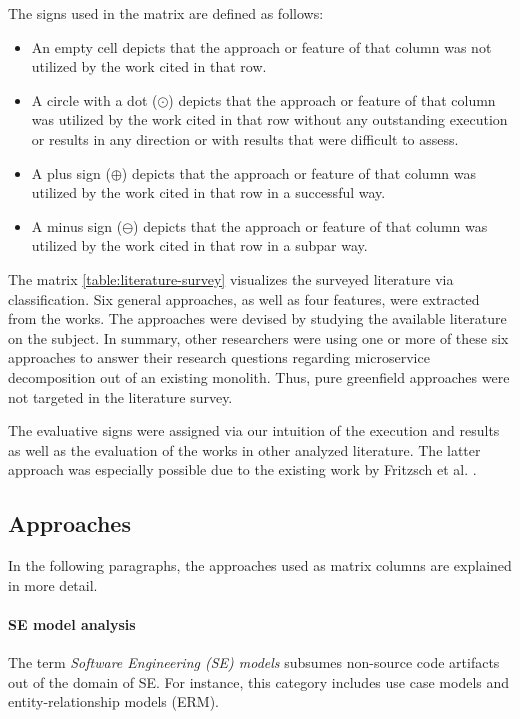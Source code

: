 \documentclass[12pt,a4paper]{report}
\begin{document}
\begin{table}[ht!]
{  The signs used in the matrix  are defined as follows:
  \begin{itemize}[noitemsep]
      \item An empty cell depicts that the approach or feature of that column was not utilized
      by the work cited in that row.
      \item A circle with a dot ($\odot$) depicts that the approach or feature
      of that column was utilized by the work cited in that row without any outstanding execution
      or results in any direction or with results that were difficult to assess.
      \item A plus sign ($\oplus$) depicts that the approach or feature
      of that column was utilized by the work cited in that row in a successful way.
      \item A minus sign ($\ominus$) depicts that the approach or feature
      of that column was utilized by the work cited in that row in a subpar way.
  \end{itemize}
}
\label{table:literature-survey}
\end{table}

The matrix \ref{table:literature-survey} visualizes the surveyed literature via
classification. Six general approaches, as well as four features, were
extracted from the works. The approaches were devised by studying the available
literature on the subject. In summary, other researchers were using one or more
of these six approaches to answer their research questions regarding
microservice decomposition out of an existing monolith. Thus, pure greenfield
approaches were not targeted in the literature survey.

The evaluative signs were assigned via our intuition of the execution and
results as well as the evaluation of the works in other analyzed literature.
The latter approach was especially possible due to the existing work by
Fritzsch et al. \cite{fritzsch2018monolith}.


\subsection*{Approaches}

In the following paragraphs, the approaches used as matrix columns are
explained in more detail.

\paragraph{SE model analysis}
The term \textit{Software Engineering (SE) models} subsumes non\hyp source code
artifacts out of the domain of SE.
For instance, this category includes use case models and
entity-relationship models (ERM).
\end{document}
